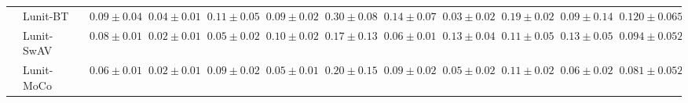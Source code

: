 \begin{tabular}{ll|cccc|c|cccc|c}
 & Lunit-BT~\cite{kang2023benchmarking} & $0.09 \pm 0.04$ & $0.04 \pm 0.01$ & $0.11 \pm 0.05$ & $0.09 \pm 0.02$ & $0.30 \pm 0.08$ & $0.14 \pm 0.07$ & $0.03 \pm 0.02$ & $0.19 \pm 0.02$ & $0.09 \pm 0.14$ & $0.120 \pm 0.065$ \\
 & Lunit-SwAV~\cite{kang2023benchmarking} & $0.08 \pm 0.01$ & $0.02 \pm 0.01$ & $0.05 \pm 0.02$ & $0.10 \pm 0.02$ & $0.17 \pm 0.13$ & $0.06 \pm 0.01$ & $0.13 \pm 0.04$ & $0.11 \pm 0.05$ & $0.13 \pm 0.05$ & $0.094 \pm 0.052$ \\
 & Lunit-MoCo~\cite{kang2023benchmarking} & $0.06 \pm 0.01$ & $0.02 \pm 0.01$ & $0.09 \pm 0.02$ & $0.05 \pm 0.01$ & $0.20 \pm 0.15$ & $0.09 \pm 0.02$ & $0.05 \pm 0.02$ & $0.11 \pm 0.02$ & $0.06 \pm 0.02$ & $0.081 \pm 0.052$ \\
\cline{1-12}
\bottomrule
\end{tabular}
